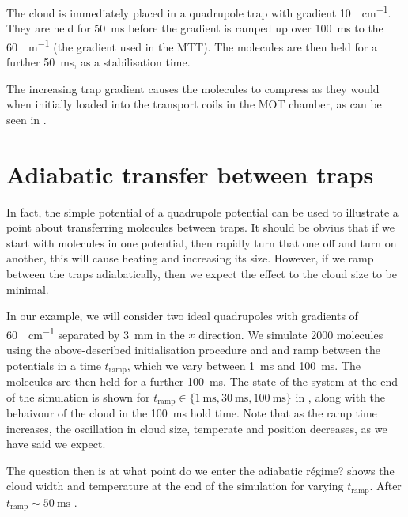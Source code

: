 The cloud is immediately placed in a quadrupole trap with gradient
\SI{10}{\gauss\per\centi\meter}. They are held for \SI{50}{\milli\second}
before the gradient is ramped up over \SI{100}{\milli\second} to the 
\SI{60}{\gauss\per\meter} (the gradient used in the MTT).
The molecules are then held for a further \SI{50}{\milli\second}, as a
stabilisation time.

The increasing trap gradient causes the
molecules to compress as they would when initially loaded into the transport
coils in the MOT chamber, as can be seen in \myfigref{}.

\section{Adiabatic transfer between traps}


In fact, the simple potential of a quadrupole potential can be used to
illustrate a point about transferring molecules between traps. It should be
obvius that if we start with molecules in one potential, then rapidly turn that
one off and turn on another, this will cause heating and increasing its size.
However, if we ramp between the traps adiabatically, then we expect the effect
to the cloud size to be minimal.

In our example, we will consider two ideal quadrupoles with gradients of
\SI{60}{\gauss\per\centi\meter} separated by \SI{3}{\milli\meter} in the $x$
direction. We simulate 2000  molecules using the above-described
initialisation procedure and  and ramp between the
potentials in a time $t_\text{ramp}$, which we vary between
\SI{1}{\milli\second} and \SI{100}{\milli\second}. The molecules are then held
for a further \SI{100}{\milli\second}. The state of the system at the end of
the simulation is shown for $t_\text{ramp}\in \{\SI{1}{\milli\second},
\SI{30}{\milli\second}, \SI{100}{\milli\second}\}$ in , along with
the behaivour of the cloud in the \SI{100}{\milli\second} hold time. Note that
as the ramp time increases, the oscillation in cloud size, temperate and
position decreases, as we have said we expect.

The question then is at what point do we enter the adiabatic r\'egime?  shows the cloud width and temperature at the end of the simulation for
varying $t_\text{ramp}$. After $t_\text{ramp}\sim\SI{50}{\milli\second}$ .

